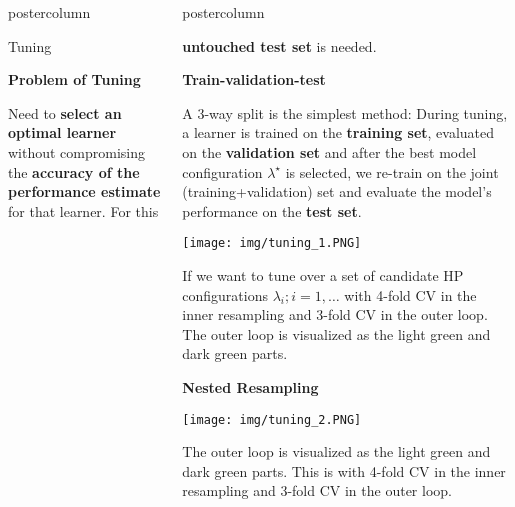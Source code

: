 \documentclass{beamer}
\newlength{\columnheight} %
\begin{document}
\begin{frame}[fragile]{}
\begin{columns}
\begin{column}{.31\textwidth}
\begin{beamercolorbox}[center]{postercolumn}
\begin{minipage}{.98\textwidth}
{	    	\begin{myblock}{Tuning}
	    	\begin{codebox} \textbf{Problem of Tuning}	\end{codebox}
Need to \textbf{select an optimal learner} without compromising the \textbf{accuracy of the performance estimate} for that learner. For this 
	    	\end{myblock}
					}
			\end{minipage}
		\end{beamercolorbox}
	\end{column}
	\begin{column}{.31\textwidth}
		\begin{beamercolorbox}[center]{postercolumn}
			\begin{minipage}{.98\textwidth}
				\parbox[t][\columnheight]{\textwidth}{
						\begin{myblock}{}
						\textbf{untouched test set} is needed.\\
                    \begin{codebox} \textbf{Train-validation-test}	\end{codebox}
A 3-way split is the simplest method:
During tuning, a learner is trained on the \textbf{training set}, evaluated on the  \textbf{validation set} and after the best model configuration $\lambda^\star$ is selected, we re-train on the joint (training+validation) set and evaluate the model's performance on the \textbf{test set}.\\

\begin{center}
             \texttt{[image: img/tuning\_1.PNG]}
               \end{center}

\hspace*{1ex}

If we want to tune over a set of candidate HP configurations $\lambda_i; i = 1, \dots$ with 4-fold CV in the inner resampling and 3-fold CV in the outer loop. The outer loop is visualized as the light green and dark green parts.

\hspace*{1ex}

 \begin{codebox} \textbf{Nested Resampling}	\end{codebox}
 
 \begin{center}
             \texttt{[image: img/tuning\_2.PNG]}
               \end{center}
The outer loop is visualized as the light green and dark green parts. This is with 4-fold CV in the inner resampling and 3-fold CV in the outer loop.

                    \end{myblock}
				}
			\end{minipage}
		\end{beamercolorbox}
	\end{column}
\end{columns}
\end{frame}
\end{document}
